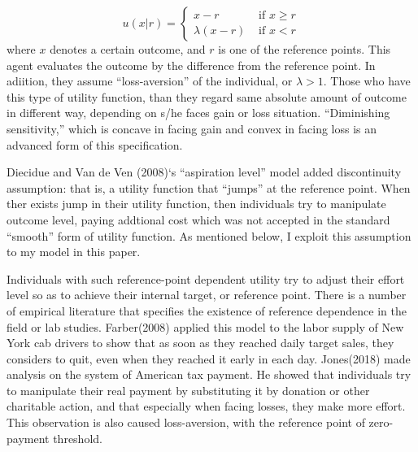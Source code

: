 \documentclass[dvipdfmx, 12pt]{article}
\begin{document}
   \[
  u(x | r) = \begin{cases}
  x - r & \text{ if }x \geq r \\
  \lambda (x - r) & \text{ if }x < r
\end{cases}
  \]
  where $x$ denotes a certain outcome, and $r$ is one of the reference points. This agent evaluates the outcome by the difference from the reference point. In adiition, they assume ``loss-aversion'' of the individual, or $\lambda > 1$. Those who have this type of utility function, than they regard same absolute amount of outcome in different way, depending on s/he faces gain or loss situation. ``Diminishing sensitivity,'' which is concave in facing gain and convex in facing loss is an advanced form of this specification.

  Diecidue and Van de Ven (2008)`s ``aspiration level'' model added discontinuity assumption: that is, a utility function that ``jumps'' at the reference point. When ther exists jump in their utility function, then individuals try to manipulate outcome level, paying addtional cost which was not accepted in the standard ``smooth'' form of utility function. As mentioned below, I exploit this assumption to my model in this paper.

  Individuals with such reference-point dependent utility try to adjust their effort level so as to achieve their internal target, or reference point. There is a number of empirical literature that specifies the existence of reference dependence in the field or lab studies. Farber(2008) applied this model to the labor supply of New York cab drivers to show that as soon as they reached daily target sales, they considers to quit, even when they reached it early in each day. Jones(2018) made analysis on the system of American tax payment. He showed that individuals try to manipulate their real payment by substituting it by donation or other charitable action, and that especially when facing losses, they make more effort. This observation is also caused loss-aversion, with the reference point of zero-payment threshold.
\end{document}
